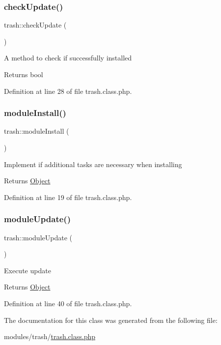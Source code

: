 \subsubsection{\texorpdfstring{check\+Update()}{checkUpdate()}}
{\footnotesize\ttfamily trash\+::check\+Update (\begin{DoxyParamCaption}{ }\end{DoxyParamCaption})}

A method to check if successfully installed \begin{DoxyReturn}{Returns}
bool 
\end{DoxyReturn}


Definition at line 28 of file trash.\+class.\+php.

\mbox{\label{classtrash_aab8bc21b844b643ba68aa2c0ef6fcc10}} 
\subsubsection{\texorpdfstring{module\+Install()}{moduleInstall()}}
{\footnotesize\ttfamily trash\+::module\+Install (\begin{DoxyParamCaption}{ }\end{DoxyParamCaption})}

Implement if additional tasks are necessary when installing \begin{DoxyReturn}{Returns}
\hyperlink{classObject}{Object} 
\end{DoxyReturn}


Definition at line 19 of file trash.\+class.\+php.

\mbox{\label{classtrash_a895b71f0ed15178c9aa04f2d0738aa31}} 
\subsubsection{\texorpdfstring{module\+Update()}{moduleUpdate()}}
{\footnotesize\ttfamily trash\+::module\+Update (\begin{DoxyParamCaption}{ }\end{DoxyParamCaption})}

Execute update \begin{DoxyReturn}{Returns}
\hyperlink{classObject}{Object} 
\end{DoxyReturn}


Definition at line 40 of file trash.\+class.\+php.



The documentation for this class was generated from the following file\+:\begin{DoxyCompactItemize}
\item 
modules/trash/\hyperlink{trash_8class_8php}{trash.\+class.\+php}\end{DoxyCompactItemize}
